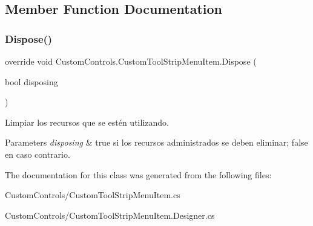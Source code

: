 \subsection{Member Function Documentation}
\mbox{\label{class_custom_controls_1_1_custom_tool_strip_menu_item_a09da84511dccda9f78441c82ff2f4508}} 
\subsubsection{\texorpdfstring{Dispose()}{Dispose()}}
{\footnotesize\ttfamily override void Custom\+Controls.\+Custom\+Tool\+Strip\+Menu\+Item.\+Dispose (\begin{DoxyParamCaption}\item[{bool}]{disposing }\end{DoxyParamCaption})\hspace{0.3cm}{\ttfamily [protected]}}



Limpiar los recursos que se estén utilizando. 


\begin{DoxyParams}{Parameters}
{\em disposing} & true si los recursos administrados se deben eliminar; false en caso contrario.\\
\hline
\end{DoxyParams}


The documentation for this class was generated from the following files\+:\begin{DoxyCompactItemize}
\item 
Custom\+Controls/Custom\+Tool\+Strip\+Menu\+Item.\+cs\item 
Custom\+Controls/Custom\+Tool\+Strip\+Menu\+Item.\+Designer.\+cs\end{DoxyCompactItemize}
